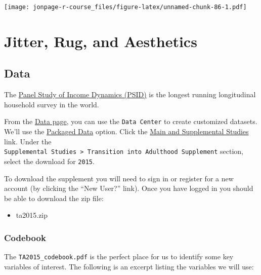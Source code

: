 \documentclass[]{book}
\providecommand{\tightlist}{%
  \setlength{\itemsep}{0pt}\setlength{\parskip}{0pt}}
\theoremstyle{definition}
\theoremstyle{definition}
\theoremstyle{remark}
\begin{document}
\texttt{[image: jonpage-r-course\_files/figure-latex/unnamed-chunk-86-1.pdf]}

\hypertarget{jitter-rug}{\chapter{Jitter, Rug, and
Aesthetics}\label{jitter-rug}}

\section{Data}\label{data-6}

The \href{https://psidonline.isr.umich.edu}{Panel Study of Income
Dynamics (PSID)} is the longest running longitudinal household survey in
the world.

From the \href{https://simba.isr.umich.edu/data/data.aspx}{Data page},
you can use the \texttt{Data\ Center} to create customized datasets.
We'll use the
\href{https://simba.isr.umich.edu/data/PackagedData.aspx}{Packaged Data}
option. Click the
\href{https://simba.isr.umich.edu/Zips/ZipMain.aspx}{Main and
Supplemental Studies} link. Under the
\texttt{Supplemental\ Studies\ \textgreater{}\ Transition\ into\ Adulthood\ Supplement}
section, select the download for \texttt{2015}.

To download the supplement you will need to sign in or register for a
new account (by clicking the ``New User?'' link). Once you have logged
in you should be able to download the zip file:

\begin{itemize}
\tightlist
\item
  ta2015.zip
\end{itemize}

\subsection{Codebook}\label{codebook}

The \texttt{TA2015\_codebook.pdf} is the perfect place for us to
identify some key variables of interest. The following is an excerpt
listing the variables we will use:
\end{document}
